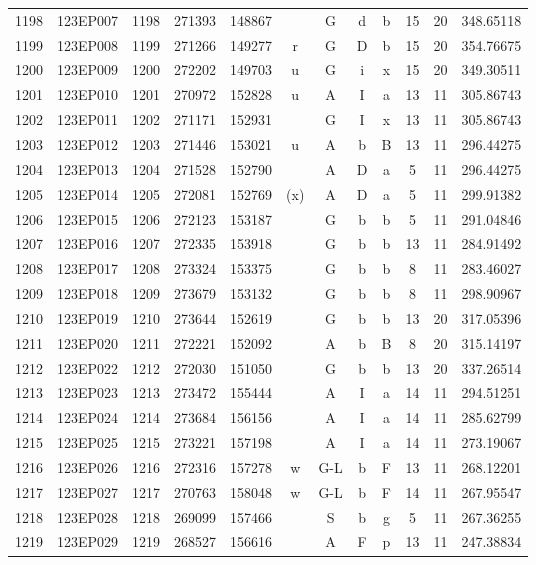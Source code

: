 \begin{tabular}{|*{12}{c|}}
1198 & 123EP007 & 1198 & 271393 & 148867 &  & G & d & b & 15 & 20 & 348.65118 \\ 
1199 & 123EP008 & 1199 & 271266 & 149277 & r & G & D & b & 15 & 20 & 354.76675 \\ 
1200 & 123EP009 & 1200 & 272202 & 149703 & u & G & i & x & 15 & 20 & 349.30511 \\ 
1201 & 123EP010 & 1201 & 270972 & 152828 & u & A & I & a & 13 & 11 & 305.86743 \\ 
1202 & 123EP011 & 1202 & 271171 & 152931 &  & G & I & x & 13 & 11 & 305.86743 \\ 
1203 & 123EP012 & 1203 & 271446 & 153021 & u & A & b & B & 13 & 11 & 296.44275 \\ 
1204 & 123EP013 & 1204 & 271528 & 152790 &  & A & D & a & 5 & 11 & 296.44275 \\ 
1205 & 123EP014 & 1205 & 272081 & 152769 & (x) & A & D & a & 5 & 11 & 299.91382 \\ 
1206 & 123EP015 & 1206 & 272123 & 153187 &  & G & b & b & 5 & 11 & 291.04846 \\ 
1207 & 123EP016 & 1207 & 272335 & 153918 &  & G & b & b & 13 & 11 & 284.91492 \\ 
1208 & 123EP017 & 1208 & 273324 & 153375 &  & G & b & b & 8 & 11 & 283.46027 \\ 
1209 & 123EP018 & 1209 & 273679 & 153132 &  & G & b & b & 8 & 11 & 298.90967 \\ 
1210 & 123EP019 & 1210 & 273644 & 152619 &  & G & b & b & 13 & 20 & 317.05396 \\ 
1211 & 123EP020 & 1211 & 272221 & 152092 &  & A & b & B & 8 & 20 & 315.14197 \\ 
1212 & 123EP022 & 1212 & 272030 & 151050 &  & G & b & b & 13 & 20 & 337.26514 \\ 
1213 & 123EP023 & 1213 & 273472 & 155444 &  & A & I & a & 14 & 11 & 294.51251 \\ 
1214 & 123EP024 & 1214 & 273684 & 156156 &  & A & I & a & 14 & 11 & 285.62799 \\ 
1215 & 123EP025 & 1215 & 273221 & 157198 &  & A & I & a & 14 & 11 & 273.19067 \\ 
1216 & 123EP026 & 1216 & 272316 & 157278 & w & G-L & b & F & 13 & 11 & 268.12201 \\ 
1217 & 123EP027 & 1217 & 270763 & 158048 & w & G-L & b & F & 14 & 11 & 267.95547 \\ 
1218 & 123EP028 & 1218 & 269099 & 157466 &  & S & b & g & 5 & 11 & 267.36255 \\ 
1219 & 123EP029 & 1219 & 268527 & 156616 &  & A & F & p & 13 & 11 & 247.38834 \\ 

\end{tabular}
